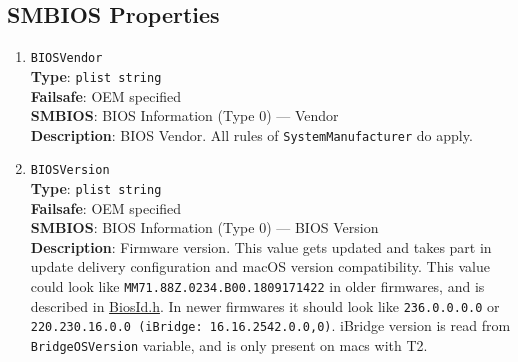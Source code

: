 \documentclass[]{article}
\begin{document}
\subsection{SMBIOS Properties}\label{platforminfosmbios}

\begin{enumerate}
\item
  \texttt{BIOSVendor}\\
  \textbf{Type}: \texttt{plist\ string}\\
  \textbf{Failsafe}: OEM specified\\
  \textbf{SMBIOS}: BIOS Information (Type 0) --- Vendor\\
  \textbf{Description}: BIOS Vendor. All rules of
  \texttt{SystemManufacturer} do apply.
\item
  \texttt{BIOSVersion}\\
  \textbf{Type}: \texttt{plist\ string}\\
  \textbf{Failsafe}: OEM specified\\
  \textbf{SMBIOS}: BIOS Information (Type 0) --- BIOS Version\\
  \textbf{Description}: Firmware version. This value gets updated and
  takes part in update delivery configuration and macOS version
  compatibility. This value could look like
  \texttt{MM71.88Z.0234.B00.1809171422} in older firmwares, and is
  described in
  \href{https://github.com/acidanthera/OpenCorePkg/blob/master/Include/Apple/Guid/BiosId.h}{BiosId.h}.
  In newer firmwares it should look like \texttt{236.0.0.0.0} or
  \texttt{220.230.16.0.0\ (iBridge:\ 16.16.2542.0.0,0)}. iBridge version
  is read from \texttt{BridgeOSVersion} variable, and is only present on
  macs with T2.


\end{enumerate}
\end{document}
